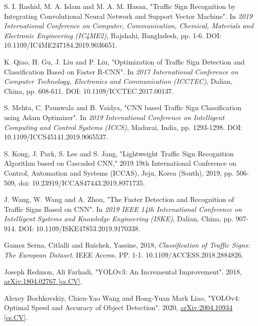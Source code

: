 \documentclass[10pt,twocolumn,letterpaper]{article}
\begin{document}
\begin{thebibliography}{9}
		S. I. Rashid, M. A. Islam and M. A. M. Hasan, "Traffic Sign Recognition by Integrating Convolutional Neural Network and Support Vector Machine". In  \textit{2019 International Conference on Computer, Communication, Chemical, Materials and Electronic Engineering (IC4ME2)}, Rajshahi, Bangladesh, pp. 1-6. DOI: 10.1109/IC4ME247184.2019.9036651.
	
		K. Qiao, H. Gu, J. Liu and P. Liu, "Optimization of Traffic Sign Detection and Classification Based on Faster R-CNN". In \textit{2017 International Conference on Computer Technology, Electronics and Communication (ICCTEC)}, Dalian, China, pp. 608-611. DOI: 10.1109/ICCTEC.2017.00137.
		
		S. Mehta, C. Paunwala and B. Vaidya, "CNN based Traffic Sign Classification using Adam Optimizer". In \textit{2019 International Conference on Intelligent Computing and Control Systems (ICCS)}, Madurai, India, pp. 1293-1298. DOI: 10.1109/ICCS45141.2019.9065537.
		
	S. Kong, J. Park, S. Lee and S. Jang, "Lightweight Traffic Sign Recognition Algorithm based on Cascaded CNN," 2019 19th International Conference on Control, Automation and Systems (ICCAS), Jeju, Korea (South), 2019, pp. 506-509, doi: 10.23919/ICCAS47443.2019.8971735.
	
		J. Wang, W. Wang and A. Zhou, "The Faster Detection and Recognition of Traffic Signs Based on CNN". In \textit{2019 IEEE 14th International Conference on Intelligent Systems and Knowledge Engineering (ISKE)}, Dalian, China, pp. 907-914. DOI: 10.1109/ISKE47853.2019.9170338.
		
		Gamez Serna, Citlalli and Ruichek, Yassine, 2018, \textit{Classification of Traffic Signs: The European Dataset}. IEEE Access. PP. 1-1. 10.1109/ACCESS.2018.2884826. 
		
		Joseph Redmon, Ali Farhadi, "YOLOv3: An Incremental Improvement". 2018, \href{https://arxiv.org/abs/1804.02767}{arXiv:1804.02767 [cs.CV]}.
		
		Alexey Bochkovskiy, Chien-Yao Wang and Hong-Yuan Mark Liao, "YOLOv4: Optimal Speed and Accuracy of Object Detection". 2020, \href{https://arxiv.org/abs/2004.10934}{arXiv:2004.10934 [cs.CV]}.
	
\end{thebibliography}

\end{document}
